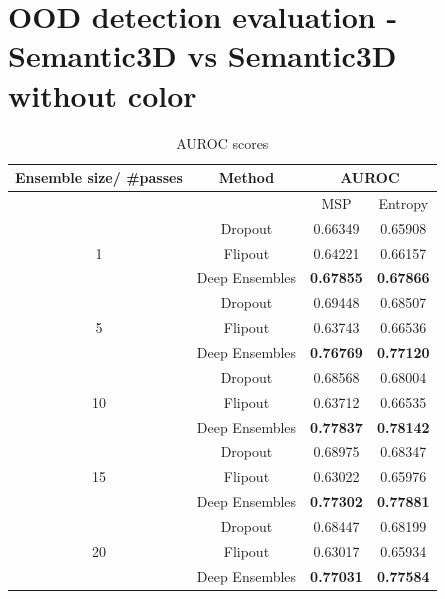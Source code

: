     \section{OOD detection evaluation -  Semantic3D vs Semantic3D without color}
    \begin{table}[h!]
        \centering
        \begin{tabular}{cccc}
        \hline
        Ensemble size/ \#passes & Method               &  \multicolumn{2}{c}{AUROC}          \\ \hline
                                &                      &  MSP             & Entropy          \\ \hline
        \multirow{3}{*}{1}      & Dropout              & 0.66349          & 0.65908          \\
                                & Flipout              & 0.64221          & 0.66157          \\
                                & Deep Ensembles       & \textbf{0.67855} & \textbf{0.67866} \\ \hline
        \multirow{3}{*}{5}      & Dropout              & 0.69448          & 0.68507          \\
                                & Flipout              & 0.63743          & 0.66536          \\
                                & Deep Ensembles       & \textbf{0.76769} & \textbf{0.77120} \\ \hline
        \multirow{3}{*}{10}     & Dropout              & 0.68568          & 0.68004          \\
                                & Flipout              & 0.63712          & 0.66535          \\
                                & Deep Ensembles       & \textbf{0.77837} & \textbf{0.78142} \\ \hline
        \multirow{3}{*}{15}     & Dropout              & 0.68975          & 0.68347          \\
                                & Flipout              & 0.63022           & 0.65976          \\
                                & Deep Ensembles       & \textbf{0.77302} & \textbf{0.77881} \\ \hline
        \multirow{3}{*}{20}     & Dropout              & 0.68447          & 0.68199          \\
                                & Flipout              & 0.63017          & 0.65934          \\
                                & Deep Ensembles       & \textbf{0.77031} & \textbf{0.77584} \\ \hline
        \end{tabular}
        \caption{AUROC scores}
    \end{table}
    \FloatBarrier

